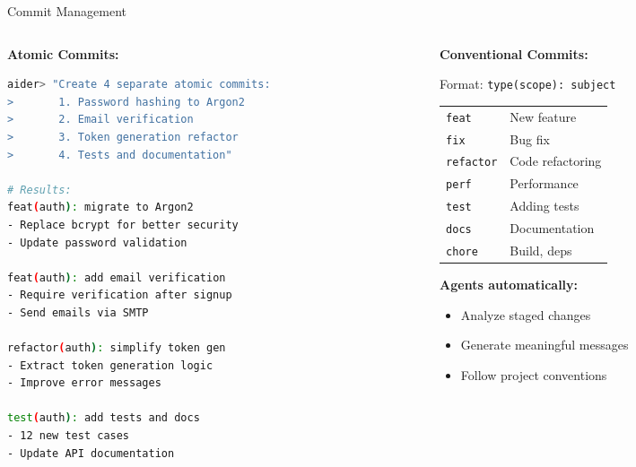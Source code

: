 \documentclass[aspectratio=169,11pt]{beamer}
\begin{document}
\begin{frame}[fragile]{Commit Management}
    \begin{columns}[T]
        \begin{column}{0.55\textwidth}
            \textbf{Atomic Commits:}
            \begin{lstlisting}[language=bash, basicstyle=\ttfamily\tiny]
aider> "Create 4 separate atomic commits:
>       1. Password hashing to Argon2
>       2. Email verification
>       3. Token generation refactor
>       4. Tests and documentation"

# Results:
feat(auth): migrate to Argon2
- Replace bcrypt for better security
- Update password validation

feat(auth): add email verification
- Require verification after signup
- Send emails via SMTP

refactor(auth): simplify token gen
- Extract token generation logic
- Improve error messages

test(auth): add tests and docs
- 12 new test cases
- Update API documentation
            \end{lstlisting}
        \end{column}
        \begin{column}{0.42\textwidth}
            \textbf{Conventional Commits:}

            \vspace{0.2cm}
            Format: \texttt{type(scope): subject}

            \vspace{0.3cm}
            \small
            \begin{tabular}{@{}ll@{}}
                \texttt{feat} & New feature \\
                \texttt{fix} & Bug fix \\
                \texttt{refactor} & Code refactoring \\
                \texttt{perf} & Performance \\
                \texttt{test} & Adding tests \\
                \texttt{docs} & Documentation \\
                \texttt{chore} & Build, deps \\
            \end{tabular}

            \vspace{0.3cm}
            \textbf{Agents automatically:}
            \begin{itemize}
                \item Analyze staged changes
                \item Generate meaningful messages
                \item Follow project conventions
            \end{itemize}
        \end{column}
    \end{columns}

\end{frame}
\end{document}
